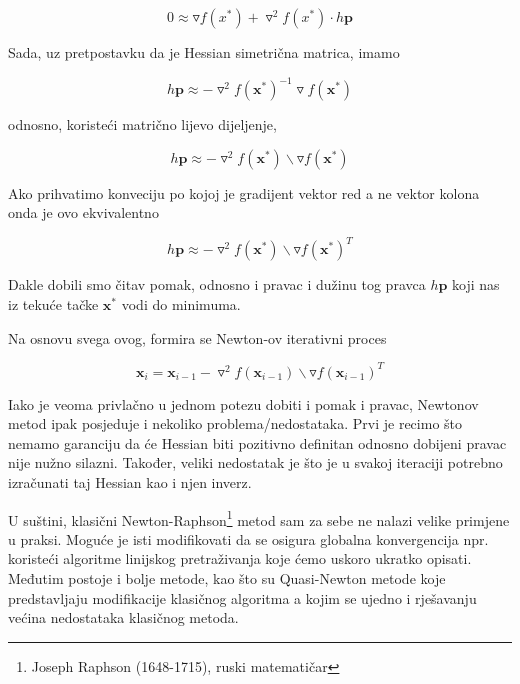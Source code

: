 \documentclass[bosnian,12pt,a4paper]{report}
\begin{document}
	\vspace{0.2cm}
	$$0 \approx \triangledown f(x^*) + \triangledown^2 f(x^*) \cdot h\textbf{p}$$
	
	\vspace{0.3cm}
	Sada, uz pretpostavku da je Hessian simetrična matrica, imamo
	
	\vspace{0.3cm}
	$$h\textbf{p} \approx -\triangledown ^2 f(\textbf{x}^*)^{-1} \triangledown f(\textbf{x}^*)$$
	
	\vspace{0.3cm}
	odnosno, koristeći matrično lijevo dijeljenje,
	
	\vspace{0.3cm}
	$$h\textbf{p} \approx -\triangledown ^2 f(\textbf{x}^*) \backslash \triangledown f(\textbf{x}^*)$$
	
	\vspace{0.5cm}
	Ako prihvatimo konveciju po kojoj je gradijent vektor red a ne vektor kolona onda je ovo ekvivalentno
	
	\vspace{0.3cm}
	$$h\textbf{p} \approx -\triangledown ^2 f(\textbf{x}^*) \backslash \triangledown f(\textbf{x}^*)^T$$
	
	\vspace{1cm}
	Dakle dobili smo čitav pomak, odnosno i pravac i dužinu tog pravca $h\textbf{p}$ koji nas iz tekuće tačke $\textbf{x}^*$ vodi do minimuma.
	
	\vspace{0.5cm}
	Na osnovu svega ovog, formira se Newton-ov iterativni proces
	
	$$\textbf{x}_i = \textbf{x}_{i-1} -\triangledown ^2 f(\textbf{x}_{i-1}) \backslash \triangledown f(\textbf{x}_{i-1})^T $$
	
	\newpage
	Iako je veoma privlačno u jednom potezu dobiti i pomak i pravac, Newtonov metod ipak posjeduje i nekoliko problema/nedostataka. Prvi je recimo što nemamo garanciju da će Hessian biti pozitivno definitan odnosno dobijeni pravac nije nužno silazni. Također, veliki nedostatak je što je u svakoj iteraciji potrebno izračunati taj Hessian kao i njen inverz. 
	
	\vspace{0.5cm}
	U suštini, klasični Newton-Raphson\footnote{Joseph Raphson (1648-1715), ruski matematičar} metod sam za sebe ne nalazi velike primjene u praksi. Moguće je isti modifikovati da se osigura globalna konvergencija npr. koristeći algoritme linijskog pretraživanja koje ćemo uskoro ukratko opisati. Međutim postoje i bolje metode, kao što su Quasi-Newton metode koje predstavljaju modifikacije klasičnog algoritma a kojim se ujedno i rješavanju većina nedostataka klasičnog metoda. 
	
\end{document}
